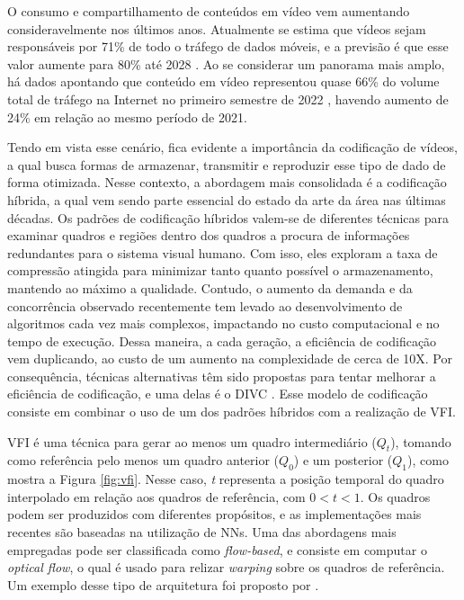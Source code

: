 O consumo e compartilhamento de conteúdos em vídeo vem aumentando consideravelmente nos últimos anos. 
Atualmente se estima que vídeos sejam responsáveis por 71\% de todo o tráfego de dados móveis, e a previsão é que esse valor aumente para 80\% até 2028 \cite{mobile}. 
Ao se considerar um panorama mais amplo, há dados apontando que conteúdo em vídeo representou quase 66\% do volume total de tráfego na Internet no primeiro semestre de 2022 \cite{traffic}, havendo aumento de 24\% em relação ao mesmo período de 2021.

Tendo em vista esse cenário, fica evidente a importância da codificação de vídeos, a qual busca formas de armazenar, transmitir e reproduzir esse tipo de dado de forma otimizada. 
Nesse contexto, a abordagem mais consolidada é a codificação híbrida, a qual vem sendo parte essencial do estado da arte da área nas últimas décadas.
Os padrões de codificação híbridos valem-se de diferentes técnicas para examinar quadros e regiões dentro dos quadros a procura de informações redundantes para o sistema visual humano. Com isso, eles exploram a taxa de compressão atingida para minimizar tanto quanto possível o armazenamento, mantendo ao máximo a qualidade. 
Contudo, o aumento da demanda e da concorrência observado recentemente tem levado ao desenvolvimento de algoritmos cada vez mais complexos, impactando no custo computacional e no tempo de execução. 
Dessa maneira, a cada geração, a eficiência de codificação vem duplicando, ao custo de um aumento na complexidade de cerca de 10X.
Por consequência, técnicas alternativas têm sido propostas para tentar melhorar a eficiência de codificação, e uma delas é o \ac{DIVC} \cite{ours}. 
Esse modelo de codificação consiste em combinar o uso de um dos padrões híbridos com a realização de \ac{VFI}. 

\ac{VFI} é uma técnica para gerar ao menos um quadro intermediário ($Q_t$), tomando como referência pelo menos um quadro anterior ($Q_0$) e um posterior ($Q_1$), como mostra a Figura \ref{fig:vfi}. 
Nesse caso, \textit{t} representa a posição temporal do quadro interpolado em relação aos quadros de referência, com $0<t<1$. 
Os quadros podem ser produzidos com diferentes propósitos, e as implementações mais recentes são baseadas na utilização de \acp{NN}. 
Uma das abordagens mais empregadas pode ser classificada como \textit{flow-based}, e consiste em computar o \textit{optical flow}, o qual é usado para relizar \textit{warping} sobre os quadros de referência. 
Um exemplo desse tipo de arquitetura foi proposto por \textcite{niklaus2020softmax}.

